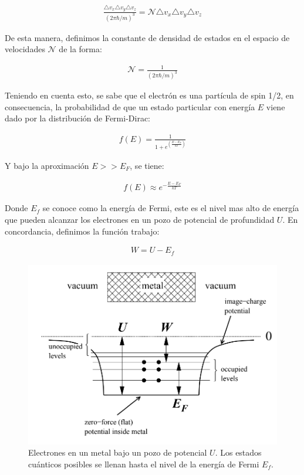 \documentclass[%
 reprint,
 amsmath,amssymb,
 aps,
]{revtex4-2}
\begin{document}
\begin{align*}
    \frac{\triangle v_{x}\triangle v_{y}\triangle v_{z}}{(2\pi\hbar/m)^{3}}= \mathcal{N} \triangle v_{x}\triangle v_{y}\triangle v_{z}
\end{align*}

\vspace{0.2 cm}
De esta manera, definimos la constante de densidad de estados en el espacio de velocidades $\mathcal{N}$ de la forma:

\begin{align}
    \label{densidaddeestd}
    \mathcal{N} = \frac{1}{(2\pi\hbar/m)^{3}}
\end{align}

\vspace{0.2 cm}
Teniendo en cuenta esto, se sabe que el electrón es una partícula de spin 1/2, en consecuencia, la probabilidad de que un estado particular con energía $E$ viene dado por la distribución de Fermi-Dirac:

\begin{align*}
    f(E) = \frac{1}{1+e^{(\frac{E-E_{F}}{kT})}}
\end{align*}

\vspace{0.2 cm}
Y bajo la aproximación $E>>E_{F}$, se tiene:

\begin{align}
    f(E) \approx e^{-\frac{E-E_{F}}{kT}}
    \label{eq: Energía de Fermi}
\end{align}

\vspace{0.2 cm}
Donde $E_f$ se conoce como la energía de Fermi, este es el nivel mas alto de energía que pueden alcanzar los electrones en un pozo de potencial de profundidad $U$. En concordancia, definimos la función trabajo:

\begin{align*}
    W = U - E_f
\end{align*}

\begin{figure}[H]
    \centering
    \includegraphics[width=0.8\linewidth]{imagenes/fermi.png}
    \caption{Electrones en un metal bajo un pozo de potencial $U$. Los estados cuánticos posibles se llenan hasta el nivel de la energía de Fermi $E_f$.}
    \label{fig:enter-label}
\end{figure}
\end{document}
